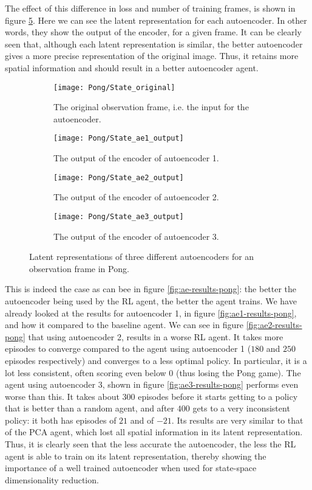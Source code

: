 The effect of this difference in loss and number of training frames, is shown in figure \ref{fig:ae-output-pong}. Here we can see the latent representation for each autoencoder. In other words, they show the output of the encoder, for a given frame. It can be clearly seen that, although each latent representation is similar, the better autoencoder gives a more precise representation of the original image. Thus, it retains more spatial information and should result in a better autoencoder agent.

\begin{figure}[h]
	\centering
	\begin{subfigure}[b]{0.40\textwidth}
		\texttt{[image: Pong/State\_original]}
		\caption{The original observation frame, i.e. the input for the autoencoder.}
		\label{fig:ae-state-original-pong} 
	\end{subfigure}\hfill
	\begin{subfigure}[b]{0.40\textwidth}
		\texttt{[image: Pong/State\_ae1\_output]}
		\caption{The output of the encoder of autoencoder 1.}
		\medskip
		\label{fig:ae1-state-pong}
	\end{subfigure}
	\begin{subfigure}[b]{0.4\textwidth}
		\texttt{[image: Pong/State\_ae2\_output]}
		\caption{The output of the encoder of autoencoder 2.}
		\label{fig:ae2-state-pong}
	\end{subfigure}\hfill
	\begin{subfigure}[b]{0.4\textwidth}
		\texttt{[image: Pong/State\_ae3\_output]}
		\caption{The output of the encoder of autoencoder 3.}
		\label{fig:ae3-state-pong}
	\end{subfigure}
	\caption{Latent representations of three different autoencoders for an observation frame in Pong.}
	\label{fig:ae-output-pong}
\end{figure}

This is indeed the case as can bee in figure \ref{fig:ae-results-pong}: the better the autoencoder being used by the RL agent, the better the agent trains. We have already looked at the results for autoencoder 1, in figure \ref{fig:ae1-results-pong}, and how it compared to the baseline agent. We can see in figure \ref{fig:ae2-results-pong} that using autoencoder 2, results in a worse RL agent. It takes more episodes to converge compared to the agent using autoencoder 1 ($180$ and $250$ episodes respectively) and converges to a less optimal policy. In particular, it is a lot less consistent, often scoring even below $0$ (thus losing the Pong game). The agent using autoencoder 3, shown in figure \ref{fig:ae3-results-pong} performs even worse than this. It takes about $300$ episodes before it starts getting to a policy that is better than a random agent, and after $400$ gets to a very inconsistent policy: it both has episodes of $21$ and of $-21$. Its results are very similar to that of the PCA agent, which lost all spatial information in its latent representation. Thus, it is clearly seen that the less accurate the autoencoder, the less the RL agent is able to train on its latent representation, thereby showing the importance of a well trained autoencoder when used for state-space dimensionality reduction.


